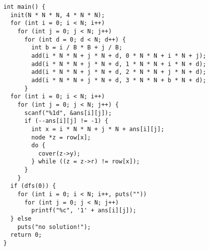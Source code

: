 \begin{verbatim}
int main() {
  init(N * N * N, 4 * N * N);
  for (int i = 0; i < N; i++)
    for (int j = 0; j < N; j++)
      for (int d = 0; d < N; d++) {
        int b = i / B * B + j / B;
        add(i * N * N + j * N + d, 0 * N * N + i * N + j);
        add(i * N * N + j * N + d, 1 * N * N + i * N + d);
        add(i * N * N + j * N + d, 2 * N * N + j * N + d);
        add(i * N * N + j * N + d, 3 * N * N + b * N + d);
      }
  for (int i = 0; i < N; i++)
    for (int j = 0; j < N; j++) {
      scanf("%1d", &ans[i][j]);
      if (--ans[i][j] != -1) {
        int x = i * N * N + j * N + ans[i][j];
        node *z = row[x];
        do {
          cover(z->y);
        } while ((z = z->r) != row[x]);
      }
    }
  if (dfs(0)) {
    for (int i = 0; i < N; i++, puts(""))
      for (int j = 0; j < N; j++)
        printf("%c", '1' + ans[i][j]);
  } else
    puts("no solution!");
  return 0;
}
\end{verbatim}
